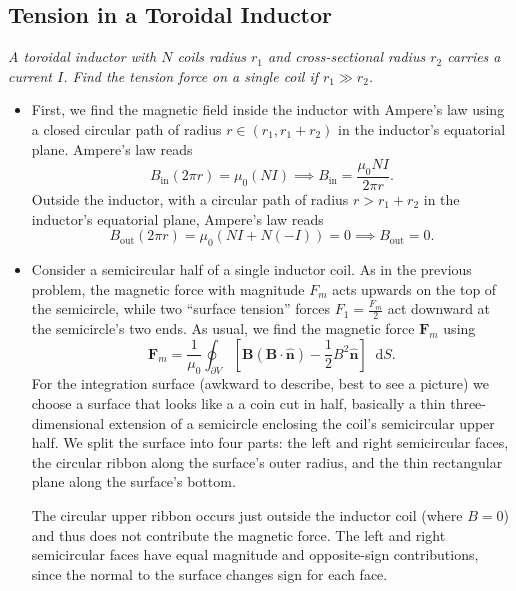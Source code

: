 \documentclass[11pt, a4paper]{article}
\newcommand{\diff}{\mathop{}\!\mathrm{d}} %
\renewcommand{\vec}[1]{\bm{#1}} %
\newcommand{\uvec}[1]{\hat{\vec{#1}}} %
\newcommand{\B}{\vec{B}}  %
\begin{document}
\subsection{Tension in a Toroidal Inductor}
\textit{A toroidal inductor with $ N $ coils radius $ r_{1} $ and cross-sectional radius $ r_{2} $ carries a current $ I $. Find the tension force on a single coil if $ r_{1} \gg r_{2} $.}
\begin{itemize}
	\item First, we find the magnetic field inside the inductor with Ampere's law using a closed circular path of radius $ r \in (r_{1}, r_{1} + r_{2}) $ in the inductor's equatorial plane. Ampere's law reads
	\begin{equation*}
		B_{\text{in}} (2\pi r) = \mu_{0} (NI) \implies B_{\text{in}} = \frac{\mu_{0}NI}{2\pi r}.
	\end{equation*}
	Outside the inductor, with a circular path of radius $ r > r_{1} + r_{2} $ in the inductor's equatorial plane, Ampere's law reads
	\begin{equation*}
		B_{\text{out}} (2\pi r) = \mu_{0} (NI + N(-I)) = 0 \implies B_{\text{out}} = 0.
	\end{equation*}
	
	\item Consider a semicircular half of a single inductor coil. As in the previous problem, the magnetic force with magnitude $ F_{m} $ acts upwards on the top of the semicircle, while two ``surface tension'' forces $ F_{1} = \frac{F_{m}}{2} $ act downward at the semicircle's two ends. As usual, we find the magnetic force $ \vec{F}_{m} $ using
	\begin{equation*}
		\vec{F}_{m} = \frac{1}{\mu_{0}}\oint_{\partial V}\left [\B(\B \cdot \uvec{n}) - \frac{1}{2}B^{2}\uvec{n}\right ] \diff S.
	\end{equation*}
	For the integration surface (awkward to describe, best to see a picture) we choose a surface that looks like a a coin cut in half, basically a thin three-dimensional extension of a semicircle enclosing the coil's semicircular upper half. We split the surface into four parts: the left and right semicircular faces, the circular ribbon along the surface's outer radius, and the thin rectangular plane along the surface's bottom. 
	
	The circular upper ribbon occurs just outside the inductor coil (where $ B = 0 $) and thus does not contribute the magnetic force. The left and right semicircular faces have equal magnitude and opposite-sign contributions, since the normal to the surface changes sign for each face. 
	

\end{itemize}
\end{document}
